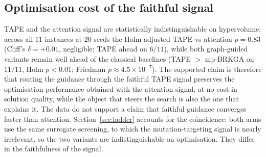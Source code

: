 \documentclass[11pt]{article}
\begin{document}
\subsection{Optimisation cost of the faithful signal}
TAPE and the attention signal are statistically indistinguishable on hypervolume: across
all $11$ instances at $20$ seeds the Holm-adjusted TAPE-vs-attention $p = 0.83$ (Cliff's
$\delta = +0.01$, negligible; TAPE ahead on $6/11$), while both graph-guided variants
remain well ahead of the classical baselines (TAPE $>$ mp-BRKGA on $11/11$, Holm
$p<0.01$; Friedman $p\approx4.5\times10^{-7}$). The supported claim is therefore that
routing the guidance through the faithful TAPE signal preserves the optimisation
performance obtained with the attention signal, at no cost in solution quality, while
the object that steers the search is also the one that explains it. The data do not
support a claim that faithful guidance converges faster than attention.
Section~\ref{sec:ladder} accounts for the coincidence: both arms use the same surrogate
screening, to which the mutation-targeting signal is nearly irrelevant, so the two
variants are indistinguishable on optimisation. They differ in the faithfulness of the
signal.
\end{document}
